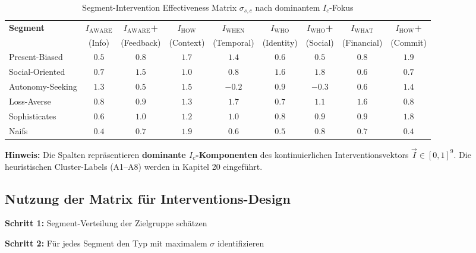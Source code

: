 \begin{table}[htbp]
\centering
\caption{Segment-Intervention Effectiveness Matrix $\sigma_{s,c}$ nach dominantem $I_c$-Fokus}
\label{tab:19-sigma-matrix-full}
\renewcommand{\arraystretch}{1.2}
\footnotesize
\begin{tabular}{@{}lcccccccc@{}}
\toprule
\textbf{Segment} & \textbf{$I_{\text{AWARE}}$} & \textbf{$I_{\text{AWARE}}$+} & \textbf{$I_{\text{HOW}}$} & \textbf{$I_{\text{WHEN}}$} & \textbf{$I_{\text{WHO}}$} & \textbf{$I_{\text{WHO}}$+} & \textbf{$I_{\text{WHAT}}$} & \textbf{$I_{\text{HOW}}$+} \\
 & (Info) & (Feedback) & (Context) & (Temporal) & (Identity) & (Social) & (Financial) & (Commit) \\
\midrule
Present-Biased & $0.5$ & $0.8$ & \cellcolor{green!25}$1.7$ & $1.4$ & $0.6$ & $0.5$ & $0.8$ & \cellcolor{green!25}$1.9$ \\
Social-Oriented & $0.7$ & $1.5$ & $1.0$ & $0.8$ & \cellcolor{green!25}$1.6$ & \cellcolor{green!25}$1.8$ & $0.6$ & $0.7$ \\
Autonomy-Seeking & $1.3$ & $0.5$ & \cellcolor{green!25}$1.5$ & \cellcolor{red!25}$-0.2$ & $0.9$ & \cellcolor{red!25}$-0.3$ & $0.6$ & $1.4$ \\
Loss-Averse & $0.8$ & $0.9$ & $1.3$ & \cellcolor{green!25}$1.7$ & $0.7$ & $1.1$ & \cellcolor{green!25}$1.6$ & $0.8$ \\
Sophisticates & $0.6$ & $1.0$ & $1.2$ & $1.0$ & $0.8$ & $0.9$ & $0.9$ & \cellcolor{green!25}$1.8$ \\
Naifs & $0.4$ & $0.7$ & \cellcolor{green!25}$1.9$ & $0.6$ & $0.5$ & $0.8$ & $0.7$ & $0.4$ \\
\bottomrule
\end{tabular}
\end{table}

\textbf{Hinweis:} Die Spalten repr\"{a}sentieren \textbf{dominante $I_c$-Komponenten} des kontinuierlichen Interventionsvektors $\vec{I} \in [0,1]^9$. Die heuristischen Cluster-Labels (A1--A8) werden in Kapitel 20 eingef\"{u}hrt.

\subsection{Nutzung der Matrix für Interventions-Design}

\textbf{Schritt 1:} Segment-Verteilung der Zielgruppe schätzen

\textbf{Schritt 2:} Für jedes Segment den Typ mit maximalem $\sigma$ identifizieren

